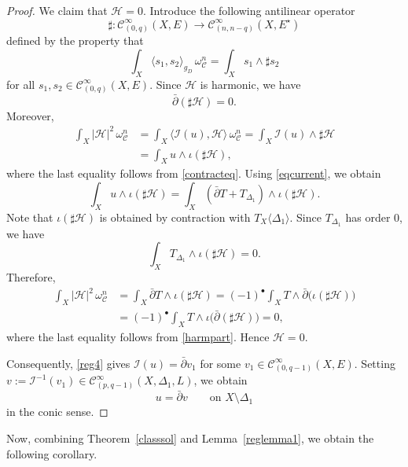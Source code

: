 \documentclass[english]{amsart}
\newcommand{\cC}{\mathcal{C}}
\newcommand{\cI}{\mathcal{I}}
\newcommand{\dbar}{\bar \partial}
\numberwithin{equation}{thm}
\begin{document}
\begin{proof}
				We claim that $\mathcal H=0$. Introduce the following antilinear operator
				\[
				\sharp:\cC^\infty_{(0,q)}(X,E)\longrightarrow \cC^\infty_{(n,n-q)}(X,E^\star)
				\]
				defined by the property that
				\[
				\int_X \langle s_1,s_2\rangle_{g_D}\,\omega_{\cC}^n
				= \int_X s_1\wedge \sharp s_2
				\]
				for all $s_1,s_2\in \cC^\infty_{(0,q)}(X,E)$.
				Since $\mathcal H$ is harmonic, we have
				\begin{equation}\label{harmpart}
					\dbar(\sharp \mathcal H)=0.
				\end{equation}
				Moreover,
				\begin{align}\label{reg5}
					\int_X |\mathcal H|^2\,\omega_{\cC}^n
					&= \int_X \langle \cI(u),\mathcal H\rangle\,\omega_{\cC}^n
					= \int_X \cI(u)\wedge \sharp \mathcal H \\
					&= \int_X u\wedge \iota(\sharp \mathcal H), \nonumber
				\end{align}
				where the last equality follows from \eqref{contracteq}. Using \eqref{eqcurrent}, we obtain
				\begin{equation}\label{reg7}
					\int_X u\wedge \iota(\sharp \mathcal H)
					= \int_X (\dbar T + T_{\Delta_1})\wedge \iota(\sharp \mathcal H).
				\end{equation}
				Note that $\iota(\sharp \mathcal H)$ is obtained by contraction with $T_X\langle \Delta_1\rangle$. Since $T_{\Delta_1}$ has order $0$, we have
				\[
				\int_X T_{\Delta_1}\wedge \iota(\sharp \mathcal H)=0.
				\]
				Therefore,
				\begin{align}\label{reg8}
					\int_X |\mathcal H|^2\,\omega_{\cC}^n
					&= \int_X \dbar T\wedge \iota(\sharp \mathcal H)
					= (-1)^\bullet \int_X T\wedge \dbar\bigl(\iota(\sharp \mathcal H)\bigr) \\
					&= (-1)^\bullet \int_X T\wedge \iota\bigl(\dbar(\sharp \mathcal H)\bigr)
					=0, \nonumber
				\end{align}
				where the last equality follows from \eqref{harmpart}. Hence $\mathcal H=0$.
				
				\medskip
				
				Consequently, \eqref{reg4} gives $\cI(u)=\dbar v_1$ for some $v_1\in \cC^\infty_{(0,q-1)}(X,E)$. Setting $v:=\cI^{-1}(v_1)\in \cC^\infty_{(p,q-1)}(X,\Delta_1,L)$, we obtain
				\[
				u=\dbar v \qquad \text{on } X\setminus \Delta_1
				\]
				in the conic sense.
			\end{proof}
			
			Now, combining Theorem~\ref{classsol} and Lemma~\ref{reglemma1}, we obtain the following corollary.
			
\end{document}
